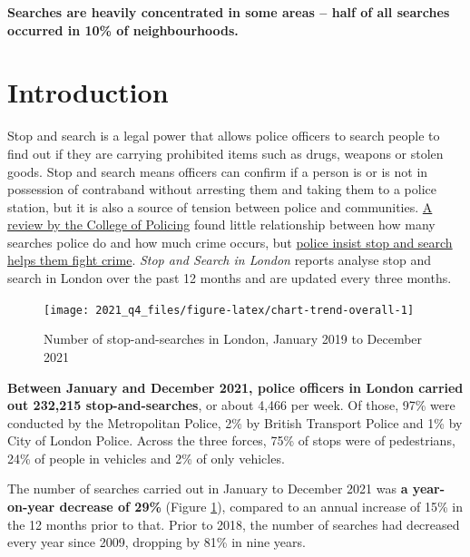 \documentclass[
  a4paper,
  twoside, 11pt]{article}
\begin{document}
\textbf{\sffamily Searches are heavily concentrated in some areas -- half of all searches occurred in 10\% of neighbourhoods.}

\hypertarget{introduction}{%
\section{Introduction}\label{introduction}}

Stop and search is a legal power that allows police officers to search people to find out if they are carrying prohibited items such as drugs, weapons or stolen goods. Stop and search means officers can confirm if a person is or is not in possession of contraband without arresting them and taking them to a police station, but it is also a source of tension between police and communities. \href{https://whatworks.college.police.uk/Research/Documents/SS_and_crime_report.pdf}{A review by the College of Policing} found little relationship between how many searches police do and how much crime occurs, but \href{https://www.met.police.uk/advice/advice-and-information/st-s/stop-and-search/why-we-use-stop-and-search/}{police insist stop and search helps them fight crime}. \emph{Stop and Search in London} reports analyse stop and search in London over the past 12 months and are updated every three months.



\begin{figure}[bh]

{\centering \texttt{[image: 2021\_q4\_files/figure-latex/chart-trend-overall-1]} 

}

\caption{Number of stop-and-searches in London, January 2019 to December 2021}\label{fig:chart-trend-overall}
\end{figure}

\textbf{Between January and December 2021, police officers in London carried out 232,215 stop-and-searches}, or about 4,466 per week. Of those, 97\% were conducted by the Metropolitan Police, 2\% by British Transport Police and 1\% by City of London Police. Across the three forces, 75\% of stops were of pedestrians, 24\% of people in vehicles and 2\% of only vehicles.

The number of searches carried out in January to December 2021 was \textbf{a year-on-year decrease of 29\%} (Figure \ref{fig:chart-trend-overall}), compared to an annual increase of 15\% in the 12 months prior to that. Prior to 2018, the number of searches had decreased every year since 2009, dropping by 81\% in nine years.
\end{document}
